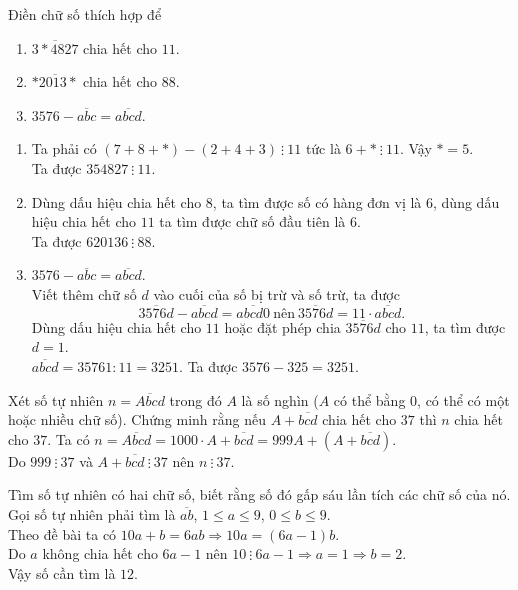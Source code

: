 \begin{bt}%
 Điền chữ số thích hợp để
 \begin{enumerate}
  \item $\overline{3*4827}$ chia hết cho $11$.
  \item $\overline{*2013*}$ chia hết cho $88$.
  \item $3576-\overline{abc}=\overline{abcd}$.
 \end{enumerate}
 \loigiai
  {
  \begin{enumerate}
   \item Ta phải có $(7+8+*)-(2+4+3)\ \vdots\ 11$ tức là $6 +*\ \vdots\ 11$. Vậy $* = 5$.\\
   Ta được $354827 \ \vdots \ 11$.
   \item Dùng dấu hiệu chia hết cho $8$, ta tìm được số có hàng đơn vị là $6$, dùng dấu hiệu chia hết cho $11$ ta tìm được chữ số đầu tiên là $6$.\\
   Ta được $620136 \ \vdots \ 88$.
   \item $3576-\overline{abc}=\overline{abcd}$.\\
   Viết thêm chữ số $d$ vào cuối của số bị trừ và số trừ, ta được $$\overline{3576d}-\overline{abcd}=\overline{abcd0} \ \text{nên} \ \overline{3576d} = 11 \cdot \overline{abcd}. $$
   Dùng dấu hiệu chia hết cho $11$ hoặc đặt phép chia $\overline{3576d}$ cho $11$, ta tìm được $d=1$.\\
   $\overline{abcd}=35761 : 11=3251$. Ta được $3576-325=3251$. 
  \end{enumerate}		
  }
\end{bt}

\begin{bt}%
 Xét số tự nhiên $n=\overline{Abcd}$ trong đó $A$ là số nghìn ($A$ có thể bằng $0$, có thể có một hoặc nhiều chữ số). Chứng minh rằng nếu $A+\overline{bcd}$ chia hết cho $37$ thì $n$ chia hết cho $37$.
 \loigiai
  {
  Ta có $n=\overline{Abcd}=1000 \cdot A+\overline{bcd}=999 A+\left(A+\overline{bcd}\right)$.\\
  Do $999 \ \vdots \ 37$ và $A+\overline{bcd} \ \vdots \ 37$ nên $n \ \vdots \ 37$.	
  }
\end{bt}

\begin{bt}%
 Tìm số tự nhiên có hai chữ số, biết rằng số đó gấp sáu lần tích các chữ số của nó.
 \loigiai
  {
  Gọi số tự nhiên phải tìm là $\overline{ab}$, $1 \leq a \leq 9$, $0 \leq b \leq 9$.\\ Theo đề bài ta có 	$10a+b=6ab \Rightarrow 10a = (6a-1)b$.\\ Do $a$ không chia hết cho $6a - 1$ nên $10 \ \vdots \ 6a-1 \Rightarrow a = 1 \Rightarrow b=2$.\\
  Vậy số cần tìm là $12$.
  }
\end{bt}

